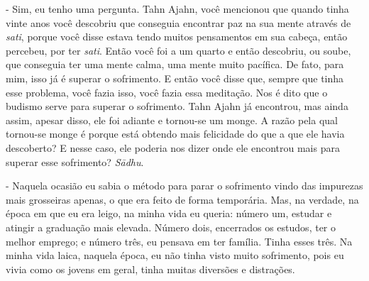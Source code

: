 - Sim, eu tenho uma pergunta. Tahn Ajahn, você mencionou que
quando tinha vinte anos você descobriu que conseguia encontrar paz na
sua mente através de \textit{sati}, porque você disse estava tendo
muitos pensamentos em sua cabeça, então percebeu, por ter
\textit{sati}. Então você foi a um quarto e então descobriu, ou soube,
que conseguia ter uma mente calma, uma mente muito pacífica. De fato,
para mim, isso já é superar o sofrimento. E então você disse que,
sempre que tinha esse problema, você fazia isso, você fazia essa
meditação. Nos é dito que o budismo serve para superar o sofrimento.
Tahn Ajahn\textit{ }já encontrou, mas ainda assim, apesar disso, ele
foi adiante e tornou-se um monge. A razão pela qual tornou-se monge é
porque está obtendo mais felicidade do que a que ele havia descoberto?
E nesse caso, ele poderia nos dizer onde ele encontrou mais para
superar esse sofrimento? \textit{S\=adhu}.

- Naquela ocasião eu sabia o método para parar o sofrimento vindo
das impurezas mais grosseiras apenas, o que era feito de forma
temporária. Mas, na verdade, na época em que eu era leigo, na minha
vida eu queria: número um, estudar e atingir a graduação mais elevada.
Número dois, encerrados os estudos, ter o melhor emprego; e número
três, eu pensava em ter família. Tinha esses três. Na minha vida laica,
naquela época, eu não tinha visto muito sofrimento, pois eu vivia como
os jovens em geral, tinha muitas diversões e distrações.

